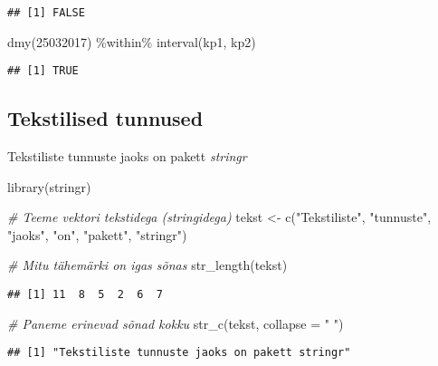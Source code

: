 \documentclass[
]{book}
\newenvironment{Shaded}{\begin{snugshade}}{\end{snugshade}}
\newcommand{\AttributeTok}[1]{\textcolor[rgb]{0.77,0.63,0.00}{#1}}
\newcommand{\CommentTok}[1]{\textcolor[rgb]{0.56,0.35,0.01}{\textit{#1}}}
\newcommand{\DecValTok}[1]{\textcolor[rgb]{0.00,0.00,0.81}{#1}}
\newcommand{\FunctionTok}[1]{\textcolor[rgb]{0.00,0.00,0.00}{#1}}
\newcommand{\NormalTok}[1]{#1}
\newcommand{\OtherTok}[1]{\textcolor[rgb]{0.56,0.35,0.01}{#1}}
\newcommand{\SpecialCharTok}[1]{\textcolor[rgb]{0.00,0.00,0.00}{#1}}
\newcommand{\StringTok}[1]{\textcolor[rgb]{0.31,0.60,0.02}{#1}}
\begin{document}
\begin{verbatim}
## [1] FALSE
\end{verbatim}

\begin{Shaded}
\begin{Highlighting}[]
\FunctionTok{dmy}\NormalTok{(}\DecValTok{25032017}\NormalTok{) }\SpecialCharTok{\%within\%} \FunctionTok{interval}\NormalTok{(kp1, kp2)}
\end{Highlighting}
\end{Shaded}

\begin{verbatim}
## [1] TRUE
\end{verbatim}

\hypertarget{tekstilised-tunnused}{%
\subsection{Tekstilised tunnused}\label{tekstilised-tunnused}}

Tekstiliste tunnuste jaoks on pakett \emph{stringr}

\begin{Shaded}
\begin{Highlighting}[]
\FunctionTok{library}\NormalTok{(stringr)}

\CommentTok{\# Teeme vektori tekstidega (stringidega)}
\NormalTok{tekst }\OtherTok{\textless{}{-}} \FunctionTok{c}\NormalTok{(}\StringTok{"Tekstiliste"}\NormalTok{, }\StringTok{"tunnuste"}\NormalTok{, }\StringTok{"jaoks"}\NormalTok{, }\StringTok{"on"}\NormalTok{, }\StringTok{"pakett"}\NormalTok{, }\StringTok{"stringr"}\NormalTok{)}

\CommentTok{\# Mitu tähemärki on igas sõnas}
\FunctionTok{str\_length}\NormalTok{(tekst) }
\end{Highlighting}
\end{Shaded}

\begin{verbatim}
## [1] 11  8  5  2  6  7
\end{verbatim}

\begin{Shaded}
\begin{Highlighting}[]
\CommentTok{\# Paneme erinevad sõnad kokku}
\FunctionTok{str\_c}\NormalTok{(tekst, }\AttributeTok{collapse =} \StringTok{" "}\NormalTok{)}
\end{Highlighting}
\end{Shaded}

\begin{verbatim}
## [1] "Tekstiliste tunnuste jaoks on pakett stringr"
\end{verbatim}
\end{document}
